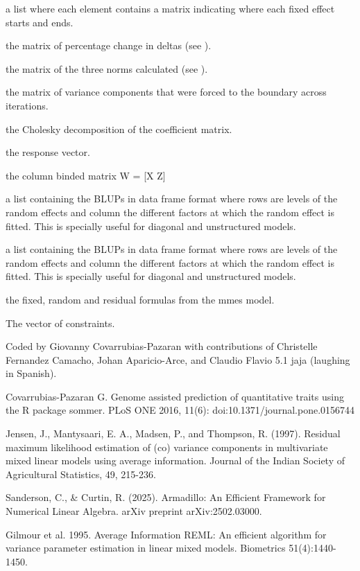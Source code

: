 \documentclass[a4paper]{book}
\begin{document}
\begin{Value}
\begin{ldescription}
\item[\code{partitionsX}] a list where each element contains a matrix indicating where 
each fixed effect starts and ends.
\item[\code{percDelta}] the matrix of percentage change in deltas (see ).
\item[\code{normMonitor}] the matrix of the three norms calculated (see ).
\item[\code{toBoundary}] the matrix of variance components that were forced to the
boundary across iterations.
\item[\code{Cchol}] the Cholesky decomposition of the coefficient matrix.
\item[\code{y}] the response vector.
\item[\code{W}] the column binded matrix W = [X Z] 
\item[\code{uList}] a list containing the BLUPs in data frame format where rows are 
levels of the random effects and column the different factors at 
which the random effect is fitted. This is specially useful for 
diagonal and unstructured models.
\item[\code{uPevList}] a list containing the BLUPs in data frame format where rows are 
levels of the random effects and column the different factors at 
which the random effect is fitted. This is specially useful for 
diagonal and unstructured models.
\item[\code{args}] the fixed, random and residual formulas from the mmes model.
\item[\code{constraints}] The vector of constraints.

\end{ldescription}
\end{Value}
%
\begin{Author}\relax

Coded by Giovanny Covarrubias-Pazaran with contributions of Christelle Fernandez 
Camacho, Johan Aparicio-Arce, and Claudio Flavio 5.1 jaja (laughing in Spanish).

\end{Author}
%
\begin{References}\relax

Covarrubias-Pazaran G. Genome assisted prediction of quantitative traits using 
the R package sommer. PLoS ONE 2016, 11(6): doi:10.1371/journal.pone.0156744

Jensen, J., Mantysaari, E. A., Madsen, P., and Thompson, R. (1997). Residual 
maximum likelihood estimation of (co) variance components in multivariate mixed 
linear models using average information. Journal of the Indian Society of
Agricultural Statistics, 49, 215-236.

Sanderson, C., \& Curtin, R. (2025). Armadillo: An Efficient Framework for 
Numerical Linear Algebra. arXiv preprint arXiv:2502.03000.

Gilmour et al. 1995. Average Information REML: An efficient algorithm for 
variance parameter estimation in linear mixed models. Biometrics 51(4):1440-1450.

\end{References}
\end{document}
